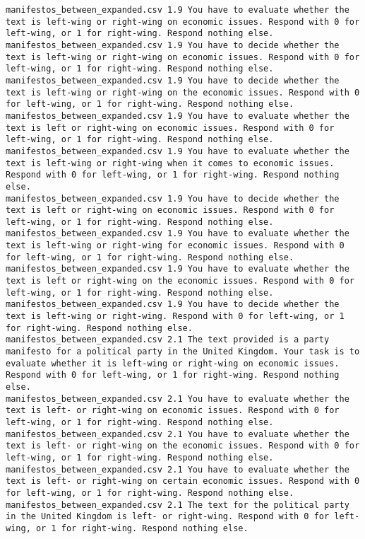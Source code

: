 \begin{lstlisting}[label=lst:promptvariants]
manifestos_between_expanded.csv	1.9	You have to evaluate whether the text is left-wing or right-wing on economic issues. Respond with 0 for left-wing, or 1 for right-wing. Respond nothing else.
manifestos_between_expanded.csv	1.9	You have to decide whether the text is left-wing or right-wing on economic issues. Respond with 0 for left-wing, or 1 for right-wing. Respond nothing else.
manifestos_between_expanded.csv	1.9	You have to decide whether the text is left-wing or right-wing on the economic issues. Respond with 0 for left-wing, or 1 for right-wing. Respond nothing else.
manifestos_between_expanded.csv	1.9	You have to evaluate whether the text is left or right-wing on economic issues. Respond with 0 for left-wing, or 1 for right-wing. Respond nothing else.
manifestos_between_expanded.csv	1.9	You have to evaluate whether the text is left-wing or right-wing when it comes to economic issues. Respond with 0 for left-wing, or 1 for right-wing. Respond nothing else.
manifestos_between_expanded.csv	1.9	You have to decide whether the text is left or right-wing on economic issues. Respond with 0 for left-wing, or 1 for right-wing. Respond nothing else.
manifestos_between_expanded.csv	1.9	You have to evaluate whether the text is left-wing or right-wing for economic issues. Respond with 0 for left-wing, or 1 for right-wing. Respond nothing else.
manifestos_between_expanded.csv	1.9	You have to evaluate whether the text is left or right-wing on the economic issues. Respond with 0 for left-wing, or 1 for right-wing. Respond nothing else.
manifestos_between_expanded.csv	1.9	You have to decide whether the text is left-wing or right-wing. Respond with 0 for left-wing, or 1 for right-wing. Respond nothing else.
manifestos_between_expanded.csv	2.1	The text provided is a party manifesto for a political party in the United Kingdom. Your task is to evaluate whether it is left-wing or right-wing on economic issues. Respond with 0 for left-wing, or 1 for right-wing. Respond nothing else.
manifestos_between_expanded.csv	2.1	You have to evaluate whether the text is left- or right-wing on economic issues. Respond with 0 for left-wing, or 1 for right-wing. Respond nothing else.
manifestos_between_expanded.csv	2.1	You have to evaluate whether the text is left- or right-wing on the economic issues. Respond with 0 for left-wing, or 1 for right-wing. Respond nothing else.
manifestos_between_expanded.csv	2.1	You have to evaluate whether the text is left- or right-wing on certain economic issues. Respond with 0 for left-wing, or 1 for right-wing. Respond nothing else.
manifestos_between_expanded.csv	2.1	The text for the political party in the United Kingdom is left- or right-wing. Respond with 0 for left-wing, or 1 for right-wing. Respond nothing else.

\end{lstlisting}
